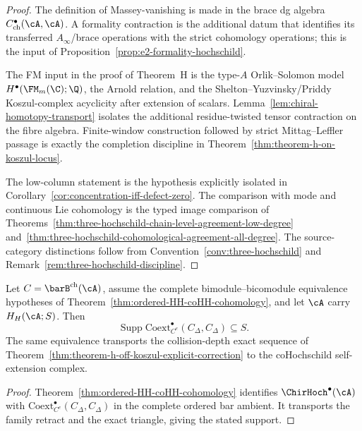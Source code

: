 \begin{proof}
The definition of Massey-vanishing is made in the brace dg algebra
$C^\bullet_{\mathrm{ch}}(\cA,\cA)$.  A formality contraction is the
additional datum that identifies its transferred $A_\infty$/brace
operations with the strict cohomology operations; this is the input of
Proposition~\ref{prop:e2-formality-hochschild}.

The FM input in the proof of Theorem~H is the type-\(A\)
Orlik--Solomon model
\(H^\bullet(\FM_m(\C);\Q)\), the Arnold relation, and the
Shelton--Yuzvinsky/Priddy Koszul-complex acyclicity after extension of
scalars. Lemma~\ref{lem:chiral-homotopy-transport} isolates the
additional residue-twisted tensor contraction on the fibre algebra.
Finite-window construction followed by strict Mittag--Leffler passage
is exactly the completion discipline in
Theorem~\ref{thm:theorem-h-on-koszul-locus}.

The low-column statement is the hypothesis explicitly isolated in
Corollary~\ref{cor:concentration-iff-defect-zero}. The comparison with
mode and continuous Lie cohomology is the typed image comparison of
Theorems~\ref{thm:three-hochschild-chain-level-agreement-low-degree}
and~\ref{thm:three-hochschild-cohomological-agreement-all-degree}.
The source-category distinctions follow from
Convention~\ref{conv:three-hochschild} and
Remark~\ref{rem:three-hochschild-discipline}.
\end{proof}

\begin{corollary}
\label{cor:theorem-h-cohochschild-transport}
Let $C=\barB^{\mathrm{ch}}(\cA)$, assume the complete
bimodule--bicomodule equivalence hypotheses of
Theorem~\ref{thm:ordered-HH-coHH-cohomology}, and let $\cA$ carry
$H_H(\cA;S)$.  Then
\[
 \operatorname{Supp}\mathrm{Coext}_{C^e}^{\bullet}
 (C_\Delta,C_\Delta)\subseteq S.
\]
The same equivalence transports the collision-depth exact sequence of
Theorem~\ref{thm:theorem-h-off-koszul-explicit-correction} to the
coHochschild self-extension complex.
\end{corollary}

\begin{proof}
Theorem~\ref{thm:ordered-HH-coHH-cohomology} identifies
$\ChirHoch^\bullet(\cA)$ with
$\mathrm{Coext}_{C^e}^{\bullet}(C_\Delta,C_\Delta)$ in the complete
ordered bar ambient.  It transports the family retract and the exact
triangle, giving the stated support.
\end{proof}

